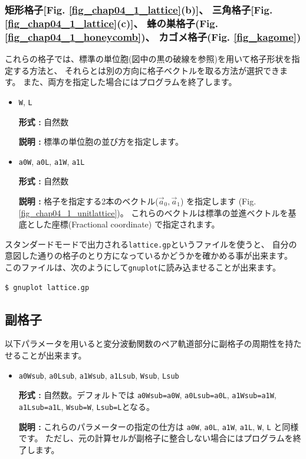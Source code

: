 \subsubsection{矩形格子[Fig. \ref{fig_chap04_1_lattice}(b)]、 
三角格子[Fig. \ref{fig_chap04_1_lattice}(c)]、
蜂の巣格子(Fig. \ref{fig_chap04_1_honeycomb})、
カゴメ格子(Fig. \ref{fig_kagome})}

これらの格子では、標準の単位胞(図中の黒の破線を参照)を用いて格子形状を指定する方法と、
それらとは別の方向に格子ベクトルを取る方法が選択できます。
また、両方を指定した場合にはプログラムを終了します。

\begin{itemize}

\item \verb|W|, \verb|L|

{\bf 形式 :} 自然数

{\bf 説明 :} 標準の単位胞の並び方を指定します。

\item \verb|a0W|, \verb|a0L|, \verb|a1W|, \verb|a1L|

{\bf 形式 :} 自然数

{\bf 説明 :} 格子を指定する2本のベクトル(${\vec a}_0, {\vec a}_1$)
を指定します (Fig. \ref{fig_chap04_1_unitlattice})。
これらのベクトルは標準の並進ベクトルを基底とした座標(Fractional coordinate)
で指定されます。

\end{itemize}

スタンダードモードで出力される\verb|lattice.gp|というファイルを使うと、
自分の意図した通りの格子のとり方になっているかどうかを確かめる事が出来ます。
このファイルは、次のようにして\verb|gnuplot|に読み込ませることが出来ます。
\begin{verbatim}
$ gnuplot lattice.gp
\end{verbatim}

\subsection{副格子}

以下パラメータを用いると変分波動関数のペア軌道部分に副格子の周期性を持たせることが出来ます。

\begin{itemize}

\item \verb|a0Wsub|, \verb|a0Lsub|, \verb|a1Wsub|, \verb|a1Lsub|, \verb|Wsub|, \verb|Lsub|

{\bf 形式 :} 自然数。デフォルトでは
\verb|a0Wsub=a0W|, \verb|a0Lsub=a0L|, \verb|a1Wsub=a1W|, \verb|a1Lsub=a1L|, 
\verb|Wsub=W|, \verb|Lsub=L|となる。

{\bf 説明 :} これらのパラメーターの指定の仕方は
\verb|a0W|, \verb|a0L|, \verb|a1W|, \verb|a1L|, \verb|W|, \verb|L|
と同様です。
ただし、元の計算セルが副格子に整合しない場合にはプログラムを終了します。

\end{itemize}

